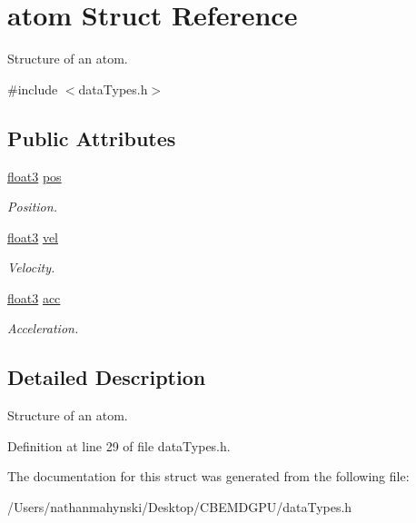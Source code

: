 \hypertarget{structatom}{\section{atom Struct Reference}
\label{structatom}
}


Structure of an atom.  




{\ttfamily \#include $<$data\-Types.\-h$>$}

\subsection*{Public Attributes}
\begin{DoxyCompactItemize}
\item 
\hypertarget{structatom_a6f304469ecac52a860f325ae6ac9ca34}{\hyperlink{structfloat3}{float3} \hyperlink{structatom_a6f304469ecac52a860f325ae6ac9ca34}{pos}}\label{structatom_a6f304469ecac52a860f325ae6ac9ca34}

\begin{DoxyCompactList}\small\item\em Position. \end{DoxyCompactList}\item 
\hypertarget{structatom_a010b2c50c7cdb6e4ec796e0c369e84d9}{\hyperlink{structfloat3}{float3} \hyperlink{structatom_a010b2c50c7cdb6e4ec796e0c369e84d9}{vel}}\label{structatom_a010b2c50c7cdb6e4ec796e0c369e84d9}

\begin{DoxyCompactList}\small\item\em Velocity. \end{DoxyCompactList}\item 
\hypertarget{structatom_a0d0e70ef3922064b59b805ac0f81d460}{\hyperlink{structfloat3}{float3} \hyperlink{structatom_a0d0e70ef3922064b59b805ac0f81d460}{acc}}\label{structatom_a0d0e70ef3922064b59b805ac0f81d460}

\begin{DoxyCompactList}\small\item\em Acceleration. \end{DoxyCompactList}\end{DoxyCompactItemize}


\subsection{Detailed Description}
Structure of an atom. 

Definition at line 29 of file data\-Types.\-h.



The documentation for this struct was generated from the following file\-:\begin{DoxyCompactItemize}
\item 
/\-Users/nathanmahynski/\-Desktop/\-C\-B\-E\-M\-D\-G\-P\-U/data\-Types.\-h\end{DoxyCompactItemize}
